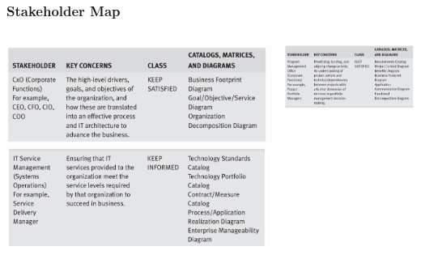 \documentclass[aspectratio=169]{beamer}
\begin{document}
	{
		\begin{frame}
			\frametitle{Stakeholder Map}
			\begin{columns}
				\begin{column}{0.5\textwidth}
					\begin{center}
						\includegraphics[width=\textwidth]{../figures/stakeholder_map_1}
						\includegraphics[width=\textwidth]{../figures/stakeholder_map_3}
					\end{center}
					
				\end{column}
				\begin{column}{0.5\textwidth}
					\begin{center}
						\includegraphics[width=\textwidth]{../figures/stakeholder_map_2}
					\end{center}
				\end{column}
			\end{columns}
			
		\end{frame}
	}
	
\end{document}
